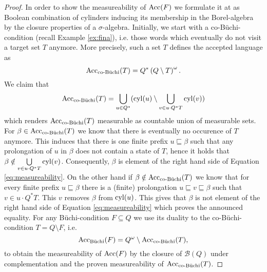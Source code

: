 \begin{proof}
  In order to show the measureability of $\operatorname{Acc}(F)$ we formulate it at as
  Boolean combination of cylinders inducing its membership in the
  Borel-algebra by the closure properties of a $\sigma$-algebra.
  Initially, we start with a co-Büchi-condition (recall Example \ref{ex:fina}),
  i.e. those words which eventually do not visit a target set $T$ anymore. More 
  precisely, such a set $T$ defines the accepted language as
  \begin{equation*}
    \operatorname{Acc}_{\operatorname{co-B\ddot{u}chi}}(T) = Q^{*}\left(Q\setminus T\right)^{\omega}.
  \end{equation*}
  We claim that
  \begin{equation}
    \operatorname{Acc}_{\operatorname{co-B\ddot{u}chi}}(T) = \bigcup\limits_{u\in Q^{*}}(
    \operatorname{cyl}(u)\setminus\bigcup\limits_{v\in u\cdot Q^{*}T}\operatorname{cyl}(v))
    \label{eq:measureability}
  \end{equation}
  which renders $\operatorname{Acc}_{\operatorname{co-B\ddot{u}chi}}(T)$ measurable as countable union of 
  measurable sets. For $\beta\in\operatorname{Acc}_{\operatorname{co-B\ddot{u}chi}}(T)$ we know that there is 
  eventually no occurence of $T$ anymore. This induces that there is one finite
  prefix $u\sqsubseteq\beta$ such that any prolongation of $u$ in $\beta$ does
  not contain a state of $T$, hence it holds that
  $\beta\notin\bigcup\limits_{v\in u\cdot Q^{*}T}\operatorname{cyl}(v)$. Consequently, 
  $\beta$ is element of the right hand side of Equation
  \ref{eq:measureability}. On the other hand if
  $\beta\notin\operatorname{Acc}_{\operatorname{co-B\ddot{u}chi}}(T)$ we know that for every finite prefix
  $u\sqsubseteq\beta$ there is a (finite) prolongation
  $u\sqsubseteq v\sqsubseteq\beta$ such that $v\in u\cdot Q^{*}T$. This $v$ 
  removes $\beta$ from $\operatorname{cyl}(u)$. This gives that $\beta$ is not element of the 
  right hand side of Equation \ref{eq:measureability} which proves the 
  announced equality. For any Büchi-condition $F\subseteq Q$ we use its duality 
  to the co-Büchi-condition $T = Q\setminus F$, i.e.
  \begin{equation*}
    \operatorname{Acc}_{\operatorname{B\ddot{u}chi}}(F) = Q^{\omega}\setminus\operatorname{Acc}_{\operatorname{co-B\ddot{u}chi}}(T),
  \end{equation*}
  to obtain the measureability of $\operatorname{Acc}(F)$ by the closure of $\mathcal{B}(Q)$
  under complementation and the proven measureability of $\operatorname{Acc}_{\operatorname{co-B\ddot{u}chi}}(T)$.
\end{proof}

